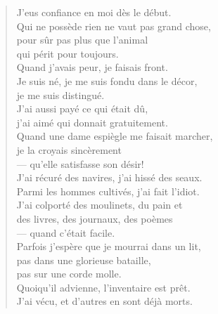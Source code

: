 \documentclass[11pt]{book}
\newcommand*{\centeredornament}{\centerline{\pgfornament[width=6cm]{88}}}
\begin{document}
\begin{verse}
  J'eus confiance en moi dès le début. \\
  Qui ne possède rien ne vaut pas grand chose, \\
  pour sûr pas plus que l'animal \\
  qui périt pour toujours. \\
  Quand j'avais peur, je faisais front. \\
  Je suis né, je me suis fondu dans le décor, \\
  je me suis distingué. \\
  J'ai aussi payé ce qui était dû, \\
  j'ai aimé qui donnait gratuitement. \\
  Quand une dame espiègle me faisait marcher,\hspace*{-1mm} \\
  je la croyais sincèrement \\
  --- qu'elle satisfasse son désir! \\
  J'ai récuré des navires, j'ai hissé des seaux. \\
  Parmi les hommes cultivés, j'ai fait l'idiot. \\
  J'ai colporté des moulinets, du pain et \\
  des livres, des journaux, des poèmes \\
  --- quand c'était facile. \\
  Parfois j'espère que je mourrai dans un lit, \\
  pas dans une glorieuse bataille, \\
  pas sur une corde molle. \\
  Quoiqu'il advienne, l'inventaire est prêt. \\
  J'ai vécu, et d'autres en sont déjà morts.
\end{verse}

\newpage

\vspace*{-15mm}
\centeredornament


\end{document}
